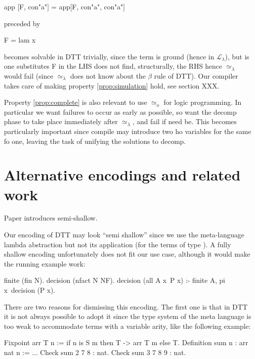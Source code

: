\documentclass[sigconf,natbib=false]{acmart}
\newcommand{\UnifRel}{\ensuremath{\simeq}}
\newcommand{\Uo}{\ensuremath{\UnifRel_o}\xspace}
\newcommand{\Ue}{\ensuremath{\UnifRel_\lambda}\xspace}
\newcommand{\llambda}{\ensuremath{\mathcal{L}_\lambda}\xspace}
\begin{document}
\begin{elpicode}
app [F, con"a"] = app[F, con"a", con"a"]
\end{elpicode}

\noindent
preceded by 

\begin{elpicode}
F = lam x\app[const f,x,x]
\end{elpicode}

\noindent
becomes solvable in DTT trivially, since the term is ground (hence in \llambda),
but is one substitutes F in the LHS does not find, structurally, the RHS
hence \Ue would fail (since \Ue does not know about the $\beta$ rule of DTT).
Our compiler takes care of making property \ref{prop:simulation} hold, see
section XXX.

Property \ref{prop:complete} is also relevant to use \Uo for logic programming.
In particular we want failures to occur as early as possible, so want
the decomp phase to take place immediately after \Ue, and fail if need be.
This becomes particularly important since compile may introduce two
ho variables for the same fo one, leaving the task of unifying the solutions
to decomp.

\section{Alternative encodings and related work}

Paper \cite{10.1145/2966268.2966272} introduces semi-shallow.

Our encoding of DTT may look ``semi shallow'' since we use the meta-language
lambda abstraction but not its application (for the terms of type ).
A fully shallow encoding unfortunately does not fit our use case, although
it would make the running example work:

\begin{elpicode}
finite (fin N).
decision (nfact N NF).
decision (all A x\ P x) :- finite A, pi x\ decision (P x).
\end{elpicode}

\noindent
There are two reasons for dismissing this encoding. The first one is that
in DTT it is not always possible to adopt it since the type system
of the meta language is too weak to accommodate terms with a variable arity,
like the following example:

\begin{coqcode}
Fixpoint arr T n := if n is S m then T -> arr T m else T.
Definition sum n : arr nat n := ...
Check sum 2   7 8   : nat.
Check sum 3   7 8 9 : nat.
\end{coqcode}
\end{document}
